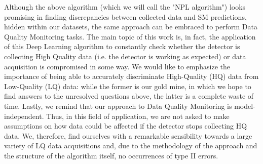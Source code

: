 Although the above algorithm (which we will call the "NPL algorithm") looks promising in finding discrepancies between
collected data and SM predictions, hidden within our datasets, the same approach can be embraced to perform Data Quality
Monitoring tasks. The main topic of this work is, in fact, the application of this Deep Learning algorithm to constantly
check whether the detector is collecting High Quality data (i.e. the detector is working as expected) or data
acquisition is compromised in some way. We would like to emphasize the importance of being able to accurately
discriminate High-Quality (HQ) data from Low-Quality (LQ) data: while the former is our gold mine, in which we hope to
find answers to the unresolved questions above, the latter is a complete waste of time. Lastly, we remind that our
approach to Data Quality Monitoring is model-independent. Thus, in this field of application, we are not asked to make
assumptions on how data could be affected if the detector stops collecting HQ data. We, therefore, find ourselves with a
remarkable sensibility towards a large variety of LQ data acquisitions and, due to the methodology of the approach and
the structure of the algorithm itself, no occurrences of type II errors.
